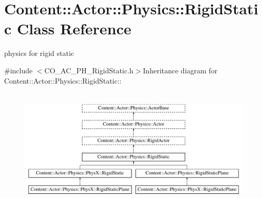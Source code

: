 \hypertarget{classContent_1_1Actor_1_1Physics_1_1RigidStatic}{
\section{Content::Actor::Physics::RigidStatic Class Reference}
\label{classContent_1_1Actor_1_1Physics_1_1RigidStatic}
}


physics for rigid static  


{\ttfamily \#include $<$CO\_\-AC\_\-PH\_\-RigidStatic.h$>$}Inheritance diagram for Content::Actor::Physics::RigidStatic::\begin{figure}[H]
\begin{center}
\leavevmode
\includegraphics[height=5.7931cm]{classContent_1_1Actor_1_1Physics_1_1RigidStatic}
\end{center}
\end{figure}
